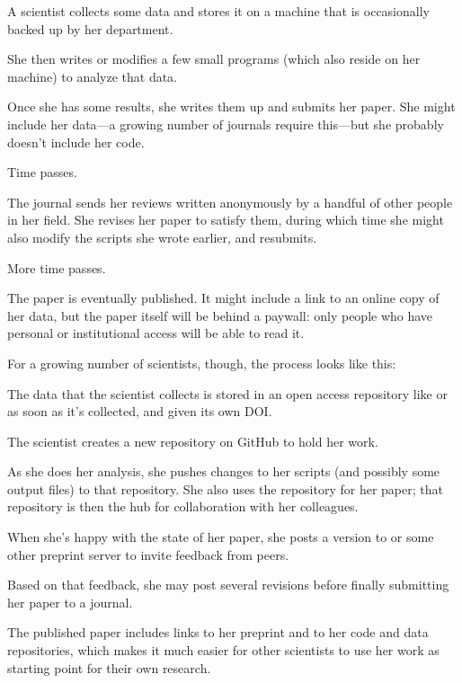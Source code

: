 \documentclass{book}
\begin{document}
\begin{swcitemize}
\item
  A scientist collects some data and stores it on a machine that is
  occasionally backed up by her department.
\item
  She then writes or modifies a few small programs (which also reside on
  her machine) to analyze that data.
\item
  Once she has some results, she writes them up and submits her paper.
  She might include her data---a growing number of journals require
  this---but she probably doesn't include her code.
\item
  Time passes.
\item
  The journal sends her reviews written anonymously by a handful of
  other people in her field. She revises her paper to satisfy them,
  during which time she might also modify the scripts she wrote earlier,
  and resubmits.
\item
  More time passes.
\item
  The paper is eventually published. It might include a link to an
  online copy of her data, but the paper itself will be behind a
  paywall: only people who have personal or institutional access will be
  able to read it.
\end{swcitemize}

For a growing number of scientists, though, the process looks like this:

\begin{swcitemize}
\item
  The data that the scientist collects is stored in an open access
  repository like  or
   as soon as it's collected, and
  given its own DOI.
\item
  The scientist creates a new repository on GitHub to hold her work.
\item
  As she does her analysis, she pushes changes to her scripts (and
  possibly some output files) to that repository. She also uses the
  repository for her paper; that repository is then the hub for
  collaboration with her colleagues.
\item
  When she's happy with the state of her paper, she posts a version to
   or some other preprint server to
  invite feedback from peers.
\item
  Based on that feedback, she may post several revisions before finally
  submitting her paper to a journal.
\item
  The published paper includes links to her preprint and to her code and
  data repositories, which makes it much easier for other scientists to
  use her work as starting point for their own research.
\end{swcitemize}
\end{document}
